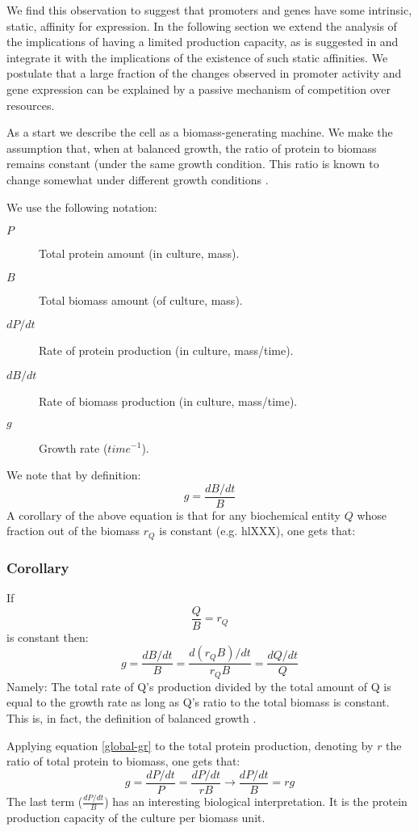 \documentclass{report}
\begin{document}
We find this observation to suggest that promoters and genes have some intrinsic, static, affinity for expression.
In the following section we extend the analysis of the implications of having a limited production capacity, as is suggested in \cite{Leeat2013} and integrate it with the implications of the existence of such static affinities.
We postulate that a large fraction of the changes observed in promoter activity and gene expression can be explained by a passive mechanism of competition over resources.

As a start we describe the cell as a biomass-generating machine.
We make the assumption that, when at balanced growth, the ratio of protein to biomass remains constant (under the same growth condition.
This ratio is known to change somewhat under different growth conditions \cite{Bremer1987}.

We use the following notation:
\begin{description}
\item[$P$] Total protein amount (in culture, mass).
\item[$B$] Total biomass amount (of culture, mass).
\item [$dP/dt$] Rate of protein production (in culture, mass/time).
\item [$dB/dt$] Rate of biomass production (in culture, mass/time).
\item [$g$] Growth rate ($time^{-1}$).
\end{description}
We note that by definition:
\[ g=\frac{dB/dt}{B}\]
A corollary of the above equation is that for any biochemical entity $Q$ whose fraction out of the biomass $r_Q$ is constant (e.g. hl{XXX}), one gets that:
\subsubsection{Corollary}
If
\[\frac{Q}{B}=r_Q\]
is constant then:
\begin{equation}
\label{global-gr}
g=\frac{dB/dt}{B}=\frac{d(r_QB)/dt}{r_QB}=\frac{dQ/dt}{Q}
\end{equation}
Namely: The total rate of Q’s production divided by the total amount of Q is equal to the growth rate as long as Q’s ratio to the total biomass is constant.
This is, in fact, the definition of balanced growth \cite{Campbell1957}.

Applying equation \ref{global-gr} to the total protein production, denoting by $r$ the ratio of total protein to biomass, one gets that:
\[g=\frac{dP/dt}{P}=\frac{dP/dt}{rB}\rightarrow\frac{dP/dt}{B}=rg\]
The last term ($\frac{dP/dt}{B}$) has an interesting biological interpretation.
It is the protein production capacity of the culture per biomass unit.
\end{document}
